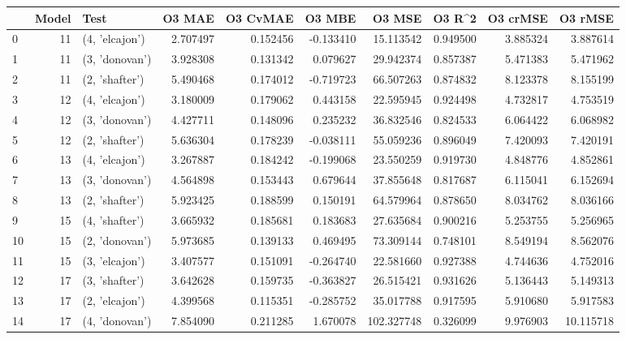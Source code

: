 \begin{tabular}{lrlrrrrrrr}
\toprule
{} &  Model &            Test &    O3 MAE &  O3 CvMAE &    O3 MBE &      O3 MSE &    O3 R\textasciicircum2 &  O3 crMSE &    O3 rMSE \\
\midrule
0  &     11 &  (4, 'elcajon') &  2.707497 &  0.152456 & -0.133410 &   15.113542 &  0.949500 &  3.885324 &   3.887614 \\
1  &     11 &  (3, 'donovan') &  3.928308 &  0.131342 &  0.079627 &   29.942374 &  0.857387 &  5.471383 &   5.471962 \\
2  &     11 &  (2, 'shafter') &  5.490468 &  0.174012 & -0.719723 &   66.507263 &  0.874832 &  8.123378 &   8.155199 \\
3  &     12 &  (4, 'elcajon') &  3.180009 &  0.179062 &  0.443158 &   22.595945 &  0.924498 &  4.732817 &   4.753519 \\
4  &     12 &  (3, 'donovan') &  4.427711 &  0.148096 &  0.235232 &   36.832546 &  0.824533 &  6.064422 &   6.068982 \\
5  &     12 &  (2, 'shafter') &  5.636304 &  0.178239 & -0.038111 &   55.059236 &  0.896049 &  7.420093 &   7.420191 \\
6  &     13 &  (4, 'elcajon') &  3.267887 &  0.184242 & -0.199068 &   23.550259 &  0.919730 &  4.848776 &   4.852861 \\
7  &     13 &  (3, 'donovan') &  4.564898 &  0.153443 &  0.679644 &   37.855648 &  0.817687 &  6.115041 &   6.152694 \\
8  &     13 &  (2, 'shafter') &  5.923425 &  0.188599 &  0.150191 &   64.579964 &  0.878650 &  8.034762 &   8.036166 \\
9  &     15 &  (4, 'shafter') &  3.665932 &  0.185681 &  0.183683 &   27.635684 &  0.900216 &  5.253755 &   5.256965 \\
10 &     15 &  (2, 'donovan') &  5.973685 &  0.139133 &  0.469495 &   73.309144 &  0.748101 &  8.549194 &   8.562076 \\
11 &     15 &  (3, 'elcajon') &  3.407577 &  0.151091 & -0.264740 &   22.581660 &  0.927388 &  4.744636 &   4.752016 \\
12 &     17 &  (3, 'shafter') &  3.642628 &  0.159735 & -0.363827 &   26.515421 &  0.931626 &  5.136443 &   5.149313 \\
13 &     17 &  (2, 'elcajon') &  4.399568 &  0.115351 & -0.285752 &   35.017788 &  0.917595 &  5.910680 &   5.917583 \\
14 &     17 &  (4, 'donovan') &  7.854090 &  0.211285 &  1.670078 &  102.327748 &  0.326099 &  9.976903 &  10.115718 \\

\end{tabular}
